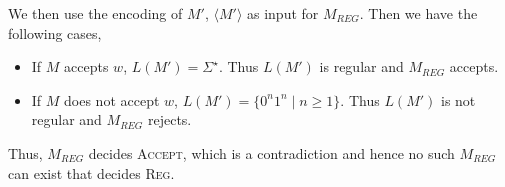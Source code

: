 \documentclass[12pt]{article}
\begin{document}
\begin{solution}
\begin{enumerate}
        
        We then use the encoding of $M'$, $\langle M' \rangle$ as input for $M_{REG}$. Then we have the following cases, 

        \begin{itemize}
        \item If $M$ accepts $w$, $L(M') = \Sigma^\star$. Thus $L(M')$ is regular and $M_{REG}$ accepts.  
        \item If $M$ does not accept $w$, $L(M') = \{0^n1^n \mid n \geq 1\}$. Thus $L(M')$ is not regular and $M_{REG}$ rejects.  
        \end{itemize}
        
        Thus, {$M_{REG}$} decides \textsc{Accept}, which is a contradiction and hence no such $M_{REG}$ can exist that decides \textsc{Reg}.
        
    \end{enumerate}
\end{solution}
\end{document}
